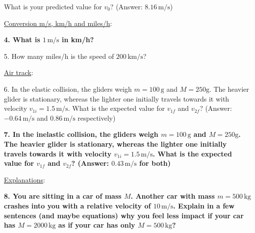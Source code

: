 What is your predicted value for $v_0$? (Answer: $8.16\,\mathrm{m/s}$)\myskip

\noindent\underline{Conversion m/s, km/h and miles/h}: \myskip

{\bf{4. What is $1\, \textrm{m/s}$ in km/h?}}
\myskip

5. How many miles/h is the speed of $200\,\textrm{km/s}$?\myskip


\noindent\underline{Air track}:\myskip

6. In the elastic collision, the gliders weigh $m = 100\,\textrm{g}$ and $M = 250\textrm{g}$. The heavier glider is stationary, whereas the lighter one initially travels towards it with velocity $v_{1i} = 1.5\,\mathrm{m/s}$. What is the expected value for $v_{1f}$ and $v_{2f}$? (Answer: $-0.64\,\mathrm{m/s}$ and $0.86\,\mathrm{m/s}$ respectively)\myskip

{\bf{7. In the inelastic collision, the gliders weigh $m = 100\,\textrm{g}$ and $M = 250\textrm{g}$. The heavier glider is stationary, whereas the lighter one initially travels towards it with velocity $v_{1i} = 1.5\,\mathrm{m/s}$. What is the expected value for $v_{1f}$ and $v_{2f}$? (Answer: $0.43\,\mathrm{m/s}$ for both)}}
\myskip

\noindent\underline{Explanations}:\myskip

{\bf{8. You are sitting in a car of mass $M$. Another car with mass $m = 500\,\textrm{kg}$ crashes into you with a relative velocity of $10\,\textrm{m/s}$. Explain in a few sentences (and maybe equations) why you feel less impact if your car has $M = 2000\,\textrm{kg}$ as if your car has only $M = 500\,\textrm{kg}$? }}



